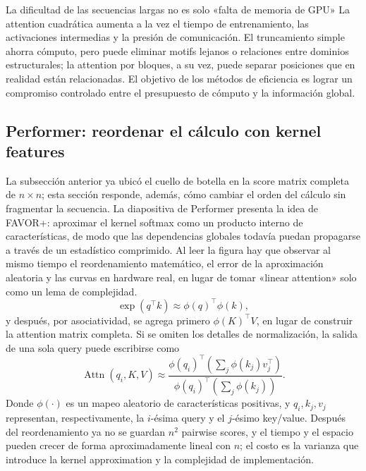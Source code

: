 \begin{warningbox}{La dificultad de las secuencias largas no es solo «falta de memoria de GPU»}
La attention cuadrática aumenta a la vez el tiempo de entrenamiento, las activaciones intermedias y la presión de comunicación. El truncamiento simple ahorra cómputo, pero puede eliminar motifs lejanos o relaciones entre dominios estructurales; la attention por bloques, a su vez, puede separar posiciones que en realidad están relacionadas. El objetivo de los métodos de eficiencia es lograr un compromiso controlado entre el presupuesto de cómputo y la información global.
\end{warningbox}

\subsection{Performer: reordenar el cálculo con kernel features}

La subsección anterior ya ubicó el cuello de botella en la score matrix completa de $n\times n$; esta sección responde, además, cómo cambiar el orden del cálculo sin fragmentar la secuencia. La diapositiva de Performer presenta la idea de FAVOR+: aproximar el kernel softmax como un producto interno de características, de modo que las dependencias globales todavía puedan propagarse a través de un estadístico comprimido. Al leer la figura hay que observar al mismo tiempo el reordenamiento matemático, el error de la aproximación aleatoria y las curvas en hardware real, en lugar de tomar «linear attention» solo como un lema de complejidad.
$$
\exp(q^{\top}k)\approx \phi(q)^{\top}\phi(k),
$$
y después, por asociatividad, se agrega primero $\phi(K)^{\top}V$, en lugar de construir la attention matrix completa. Si se omiten los detalles de normalización, la salida de una sola query puede escribirse como
$$
\operatorname{Attn}(q_i,K,V)\approx
\frac{\phi(q_i)^{\top}\left(\sum_j \phi(k_j)v_j^{\top}\right)}
{\phi(q_i)^{\top}\left(\sum_j \phi(k_j)\right)}.
$$
Donde $\phi(\cdot)$ es un mapeo aleatorio de características positivas, y $q_i,k_j,v_j$ representan, respectivamente, la $i$-ésima query y el $j$-ésimo key/value. Después del reordenamiento ya no se guardan $n^2$ pairwise scores, y el tiempo y el espacio pueden crecer de forma aproximadamente lineal con $n$; el costo es la varianza que introduce la kernel approximation y la complejidad de implementación.


